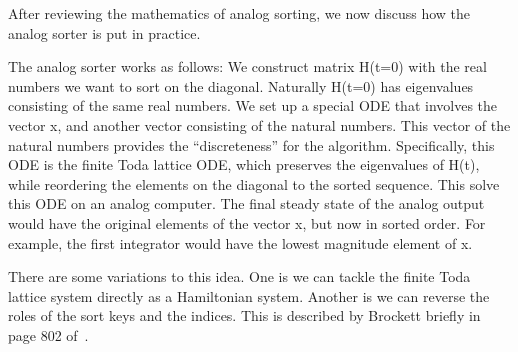 After reviewing the mathematics of analog sorting, we now discuss how the analog sorter is put in practice.

The analog sorter works as follows:
We construct matrix H(t=0) with the real numbers we want to sort on the diagonal.
Naturally H(t=0) has eigenvalues consisting of the same real numbers.
We set up a special ODE that involves the vector x, and another vector consisting of the natural numbers.
This vector of the natural numbers provides the ``discreteness'' for the algorithm.
Specifically, this ODE is the finite Toda lattice ODE, which preserves the eigenvalues of H(t), while reordering the elements on the diagonal to the sorted sequence.
This solve this ODE on an analog computer.
The final steady state of the analog output would have the original elements of the vector x, but now in sorted order.
For example, the first integrator would have the lowest magnitude element of x.



There are some variations to this idea.
One is we can tackle the finite Toda lattice system directly as a Hamiltonian system.
Another is we can reverse the roles of the sort keys and the indices.
This is described by Brockett briefly in page 802 of~\cite{brockett}.
